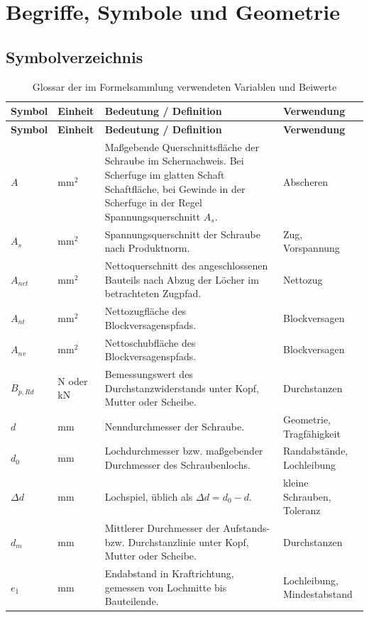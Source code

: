 \documentclass[10pt,a4paper]{article}
\begin{document}
\section{Begriffe, Symbole und Geometrie}


\subsection{Symbolverzeichnis}
\begin{longtable}{@{}p{25mm}p{24mm}p{82mm}p{24mm}@{}}
\caption{Glossar der im Formelsammlung verwendeten Variablen und Beiwerte}\\
\toprule
\textbf{Symbol} & \textbf{Einheit} & \textbf{Bedeutung / Definition} & \textbf{Verwendung} \\
\midrule
\endfirsthead
\toprule
\textbf{Symbol} & \textbf{Einheit} & \textbf{Bedeutung / Definition} & \textbf{Verwendung} \\
\midrule
\endhead
$A$ & mm$^2$ & Maßgebende Querschnittsfläche der Schraube im Schernachweis. Bei Scherfuge im glatten Schaft Schaftfläche, bei Gewinde in der Scherfuge in der Regel Spannungsquerschnitt $A_s$. & Abscheren \\
$A_s$ & mm$^2$ & Spannungsquerschnitt der Schraube nach Produktnorm. & Zug, Vorspannung \\
$A_{net}$ & mm$^2$ & Nettoquerschnitt des angeschlossenen Bauteils nach Abzug der Löcher im betrachteten Zugpfad. & Nettozug \\
$A_{nt}$ & mm$^2$ & Nettozugfläche des Blockversagenspfads. & Blockversagen \\
$A_{nv}$ & mm$^2$ & Nettoschubfläche des Blockversagenspfads. & Blockversagen \\
$B_{p,Rd}$ & N oder kN & Bemessungswert des Durchstanzwiderstands unter Kopf, Mutter oder Scheibe. & Durchstanzen \\
$d$ & mm & Nenndurchmesser der Schraube. & Geometrie, Tragfähigkeit \\
$d_0$ & mm & Lochdurchmesser bzw. maßgebender Durchmesser des Schraubenlochs. & Randabstände, Lochleibung \\
$\Delta d$ & mm & Lochspiel, üblich als $\Delta d=d_0-d$. & kleine Schrauben, Toleranz \\
$d_m$ & mm & Mittlerer Durchmesser der Aufstands- bzw. Durchstanzlinie unter Kopf, Mutter oder Scheibe. & Durchstanzen \\
$e_1$ & mm & Endabstand in Kraftrichtung, gemessen von Lochmitte bis Bauteilende. & Lochleibung, Mindestabstand \\

\end{longtable}
\end{document}
